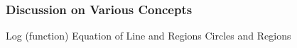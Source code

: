 \documentclass[compress]{beamer}
\newcommand{\sqBullet}[1]{  {\tiny \tiny \tiny \qBoxCol{#1!60}{ }} }
\begin{document}
\begin{frame}\frametitle{Discussion on Various Concepts}
{\tiny Log (function)
Equation of Line and Regions
Circles and Regions
}
\vspace{3in}
\end{frame}

%
%
%	
%	
%			
%







 
 
\end{document}
